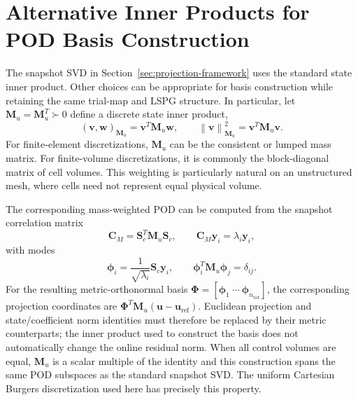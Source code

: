 \documentclass[11pt]{article}
\newcommand{\uvec}{\mathbf u}
\newcommand{\norm}[1]{\left\lVert #1 \right\rVert}
\begin{document}
\section{Alternative Inner Products for POD Basis Construction}
\label{app:lspg-sensitive}
The snapshot SVD in Section~\ref{sec:projection-framework} uses the standard
state inner product.  Other choices can be appropriate for basis construction
while retaining the same trial-map and LSPG structure.  In particular, let
$\mathbf M_u=\mathbf M_u^T\succ0$ define a discrete state inner product,
\begin{equation}
(\mathbf v,\mathbf w)_{\mathbf M_u}=\mathbf v^T\mathbf M_u\mathbf w,
\qquad
\norm{\mathbf v}_{\mathbf M_u}^2=\mathbf v^T\mathbf M_u\mathbf v.
\label{eq:mass-inner-product}
\end{equation}
For finite-element discretizations, $\mathbf M_u$ can be the consistent or
lumped mass matrix.  For finite-volume discretizations, it is commonly the
block-diagonal matrix of cell volumes.  This weighting is particularly
natural on an unstructured mesh, where cells need not represent equal
physical volume.

The corresponding mass-weighted POD can be computed from the snapshot
correlation matrix
\begin{equation}
\mathbf C_M=\mathbf S_c^T\mathbf M_u\mathbf S_c,
\qquad
\mathbf C_M\mathbf y_i=\lambda_i\mathbf y_i,
\label{eq:mass-pod-correlation}
\end{equation}
with modes
\begin{equation}
\boldsymbol\phi_i=\frac{1}{\sqrt{\lambda_i}}\mathbf S_c\mathbf y_i,
\qquad
\boldsymbol\phi_i^T\mathbf M_u\boldsymbol\phi_j=\delta_{ij}.
\label{eq:mass-pod-modes}
\end{equation}
For the resulting metric-orthonormal basis
$\boldsymbol\Phi=[\boldsymbol\phi_1\ \cdots\
\boldsymbol\phi_{n_{\mathrm{tot}}}]$, the corresponding projection
coordinates are
$\boldsymbol\Phi^T\mathbf M_u(\uvec-\uvec_{\mathrm{ref}})$.
Euclidean projection and state/coefficient norm identities must therefore
be replaced by their metric counterparts; the inner product used to
construct the basis does not automatically change the online residual norm.
When all control volumes are equal, $\mathbf M_u$ is a scalar multiple of
the identity and this construction spans the same POD subspaces as the
standard snapshot SVD.  The uniform Cartesian Burgers discretization used
here has precisely this property.
\end{document}
